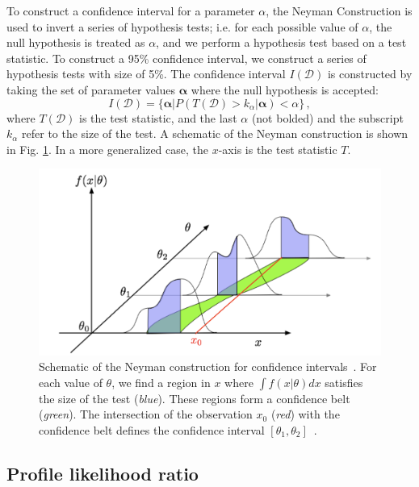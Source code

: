 To construct a confidence interval for a parameter $\alpha$, the Neyman Construction is used to invert a series of hypothesis tests; i.e. for each possible value of $\alpha$, the null hypothesis is treated as $\alpha$, and we perform a hypothesis test based on a test statistic. To construct a 95\% confidence interval, we construct a series of hypothesis tests with size of 5\%. The confidence interval $I(\mathcal{D})$ is constructed by taking the set of parameter values $\boldsymbol{\alpha}$ where the null hypothesis is accepted:
\begin{equation}
    I(\mathcal{D}) = \{ \boldsymbol{\alpha} | P(T(\mathcal{D}) > k_\alpha | \boldsymbol{\alpha}) < \alpha \} \, ,
\end{equation} 
where $T(\mathcal{D})$ is the test statistic, and the last $\alpha$ (not bolded) and the subscript $k_\alpha$ refer to the size of the test. A schematic of the Neyman construction is shown in Fig. \ref{fig:neyman-construction}. In a more generalized case, the $x$-axis is the test statistic $T$.

\begin{figure}[ht]
    \centering  
    \includegraphics[width=12cm]{figures/ch-9-event-categorization-and-signal-extraction/schematic_neyman_construction.png}
    \caption[Schematic of the Neyman construction for confidence intervals.]{Schematic of the Neyman construction for confidence intervals~\cite{2011-Statistics-Cranmer}. For each value of $\theta$, we find a region in $x$ where $\int f(x|\theta) dx$ satisfies the size of the test (\textit{blue}). These regions form a confidence belt (\textit{green}). The intersection of the observation $x_0$ (\textit{red}) with the confidence belt defines the confidence interval $[\theta_1, \theta_2]$~\cite{2011-Statistics-Cranmer}.} 
    \label{fig:neyman-construction}
\end{figure}

\subsection{Profile likelihood ratio}

